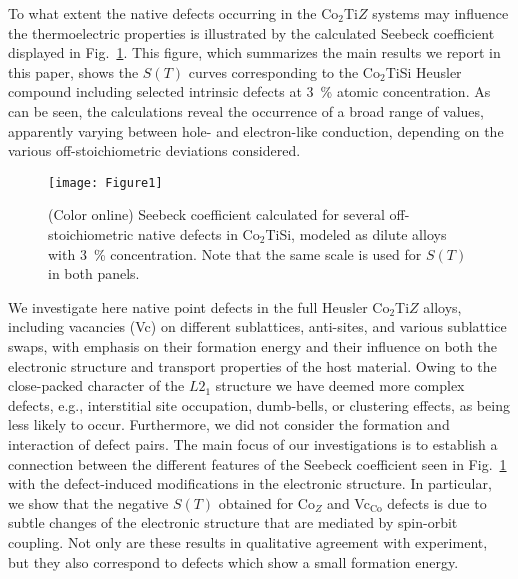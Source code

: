 \documentclass[aps,prb,twocolumn,superscriptaddress,showpacs]{revtex4}
\newcommand{\FG}[1]{Fig.~\ref{#1}}
\begin{document}
To what extent the native defects occurring in
the Co$_2$Ti$Z$ systems may influence the thermoelectric properties
is illustrated by the calculated Seebeck coefficient displayed
in \FG{SeebeckCo2TiSiDef}.
This figure, which summarizes the main results we report in this paper,
shows the $S(T)$ curves
corresponding to the Co$_2$TiSi Heusler compound including selected
intrinsic defects at $3$~\% atomic concentration. 
As can be seen, the calculations reveal the occurrence
of a broad range of values, apparently varying between 
hole- and electron-like conduction, depending on the
various off-stoichiometric deviations considered.


\begin{figure}
 \texttt{[image: Figure1]}
 \caption{(Color online) Seebeck coefficient calculated for
          several off-stoichiometric native defects in 
          Co$_2$TiSi, modeled as dilute alloys with $3$~\% concentration.
          Note that the same scale is used for $S(T)$ in both panels.}
  \label{SeebeckCo2TiSiDef}
\end{figure}

We investigate here native point defects in
the full Heusler Co$_2$Ti$Z$ alloys, 
including vacancies (Vc) on different sublattices, 
anti-sites, and various sublattice swaps,
with emphasis on their formation energy and their influence on both
the  electronic structure and transport properties of the host
material. Owing to the close-packed character
of the $L2_1$ structure we have deemed more complex defects,
e.g., interstitial site occupation, dumb-bells, or 
clustering effects, as being less likely to occur.
Furthermore, we did not consider the formation and interaction
of defect pairs.
The main focus of our investigations is to
establish a connection between the different features of the
Seebeck coefficient seen in \FG{SeebeckCo2TiSiDef} with 
the defect-induced modifications in the electronic structure.
In particular, we show that the negative $S(T)$ obtained
for Co$_Z$ and Vc$_\text{Co}$ defects
is due to subtle changes of the electronic 
structure that are mediated by spin-orbit coupling. 
Not only are these results in qualitative agreement
with experiment, but they also correspond to defects which
show a small formation energy.
\end{document}
